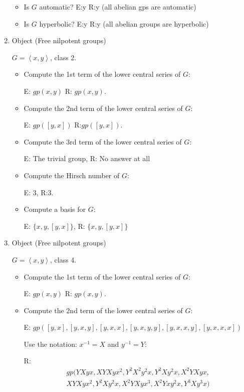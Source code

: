 \documentclass{article}
\begin{document}
\begin{enumerate}
\begin{itemize}
\item Is $G$ automatic? E:y R:y  (all abelian gps are automatic)

\item Is $G$ hyperbolic? E:y  R:y (all abelian groups are hyperbolic)
\end{itemize}
\item Object (Free nilpotent groups)

$G=\left<x,y \right>$, class 2. 

\begin{itemize}

\item Compute the 1st term of the lower central series of $G:$ 

E: $gp(x,y)$  R: $gp(x,y).$ 

\item Compute the 2nd term of the lower central series of $G:$

E: $gp([y,x])$ R:$gp([y,x]).$

\item Compute the 3rd term of the lower central series of $G:$

E: The trivial group, R: No answer at all 

\item Compute the Hirsch number of $G:$

E: 3, R:3.

\item Compute a basis for $G$:

E: $ \{x,y, [y,x]  \}$, R: $\{ x,y, [y,x]  \}$

\end{itemize}

\item Object (Free nilpotent groups)

$G=\left<x,y \right>$, class 4. 
\begin{itemize}
\item Compute the 1st term of the lower central series of $G:$ 



E: $gp(x,y)$  R: $gp(x,y).$ 

\item Compute the 2nd term of the lower central series of $G:$

E: $gp \left([y,x], [y,x,y], [y,x,x], [y,x,y,y], [y,x,x,y], [y,x,x,x] \right)$ 

Use the notation: $x^{-1}=X$ and $y^{-1}=Y$:

R: \begin{eqnarray*}
gp (YXyx, 
XYXy x^2, 
Y^{2} X^{2} y^2 x, 
Y^{2}Xy^2x,
X^{2}YXyx, \\
XYXy x^2, 
Y^{2}Xy^2 x,
X^{2}YXy x^3,
X^{2}Yx y^2 x,
Y^{3} X y^3 x ) \end{eqnarray*}



\end{itemize}
\end{enumerate}
\end{document}
